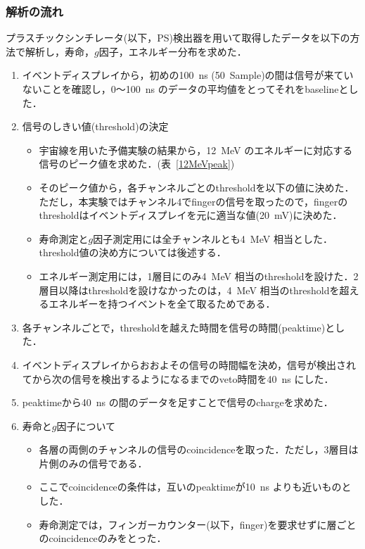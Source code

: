   \subsubsection{解析の流れ}
  プラスチックシンチレータ(以下，PS)検出器を用いて取得したデータを以下の方法で解析し，寿命，$g$因子，エネルギー分布を求めた．
  \begin{enumerate}
   \item イベントディスプレイから，初めの100~ns (50~Sample)の間は信号が来ていないことを確認し，0〜100~ns のデータの平均値をとってそれをbaselineとした．
   \item 信号のしきい値(threshold)の決定
	 \begin{itemize}
	  \item 宇宙線を用いた予備実験の結果から，12~MeV のエネルギーに対応する信号のピーク値を求めた．(表~\ref{12MeVpeak})%
	  \item そのピーク値から，各チャンネルごとのthresholdを以下の値に決めた．
		ただし，本実験ではチャンネル4でfingerの信号を取ったので，fingerのthresholdはイベントディスプレイを元に適当な値(20~mV)に決めた．
	  \item 寿命測定と$g$因子測定用には全チャンネルとも4~MeV 相当とした．threshold値の決め方については後述する．
	  \item エネルギー測定用には，1層目にのみ4~MeV 相当のthresholdを設けた．2層目以降はthresholdを設けなかったのは，4~MeV 相当のthresholdを超えるエネルギーを持つイベントを全て取るためである．
	 \end{itemize}
   \item 各チャンネルごとで，thresholdを越えた時間を信号の時間(peaktime)とした．
   \item イベントディスプレイからおおよその信号の時間幅を決め，信号が検出されてから次の信号を検出するようになるまでのveto時間を40~ns にした．
   \item peaktimeから40~ns の間のデータを足すことで信号のchargeを求めた．
   \item 寿命と$g$因子について
	 \begin{itemize}
	  \item 各層の両側のチャンネルの信号のcoincidenceを取った．ただし，3層目は片側のみの信号である．
	  \item ここでcoincidenceの条件は，互いのpeaktimeが10~ns よりも近いものとした．
	  \item 寿命測定では，フィンガーカウンター(以下，finger)を要求せずに層ごとのcoincidenceのみをとった．

\end{itemize}
\end{enumerate}

